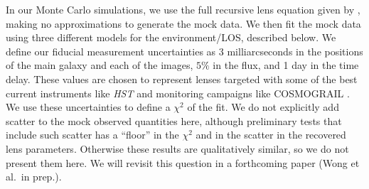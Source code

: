 In our Monte Carlo simulations, we use the full recursive lens equation given by , making no approximations to generate the mock data. We then fit the mock data using three different models for the environment/LOS, described below. We define our fiducial measurement uncertainties as 3 milliarcseconds in the positions of the main galaxy and each of the images, $5\%$ in the flux, and 1 day in the time delay. These values are chosen to represent lenses targeted with some of the best current instruments like \textit{HST} and monitoring campaigns like COSMOGRAIL \citep{Eigenbrod05}. We use these uncertainties to define a $\chi^2$ of the fit. We do not explicitly add scatter to the mock observed quantities here, although preliminary tests that include such scatter has a ``floor'' in the $\chi^2$ and in the scatter in the recovered lens parameters. Otherwise these results are qualitatively similar, so we do not present them here. We will revisit this question in a forthcoming paper (Wong et al.\ in prep.).